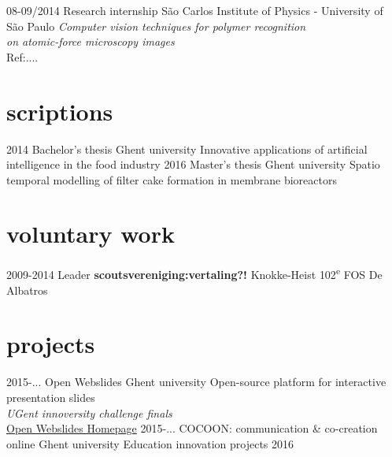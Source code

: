 \documentclass[]{friggeri-cv}
\begin{document}
\begin{entrylist}
  \entry
    {08-09/2014}
    {Research internship}
    {S\~{a}o Carlos Institute of Physics - University of S\~{a}o Paulo}
    {\emph{Computer vision techniques for polymer recognition\\ on atomic-force microscopy images} \\ Ref:....}
\end{entrylist}

\section{scriptions}

\begin{entrylist}
  \entry
    {2014}
    {Bachelor's thesis}
    {Ghent university}
    {Innovative applications of artificial intelligence in the food industry}
  \entry
    {2016}
    {Master's thesis}
    {Ghent university}
    {Spatio temporal modelling of filter cake formation in membrane bioreactors}
\end{entrylist}

\section{voluntary work}
\begin{entrylist}
 \entry
    {2009-2014}
    {Leader \textbf{scoutsvereniging:vertaling?!}}
    {Knokke-Heist}
    {102\textsuperscript{e} FOS De Albatros}
\end{entrylist} 
\section{projects}
\begin{entrylist}
 \entry
    {2015-...}
    {Open Webslides}
    {Ghent university}
    {Open-source platform for interactive presentation slides \\ \emph{UGent innoversity challenge finals} \\ \href{http://openwebslides.github.io/}{Open Webslides Homepage}}
 \entry
    {2015-...}
    {COCOON: communication \& co-creation online}
    {Ghent university}
    {Education innovation projects 2016}
    
\end{entrylist} 

% 
\end{document}

